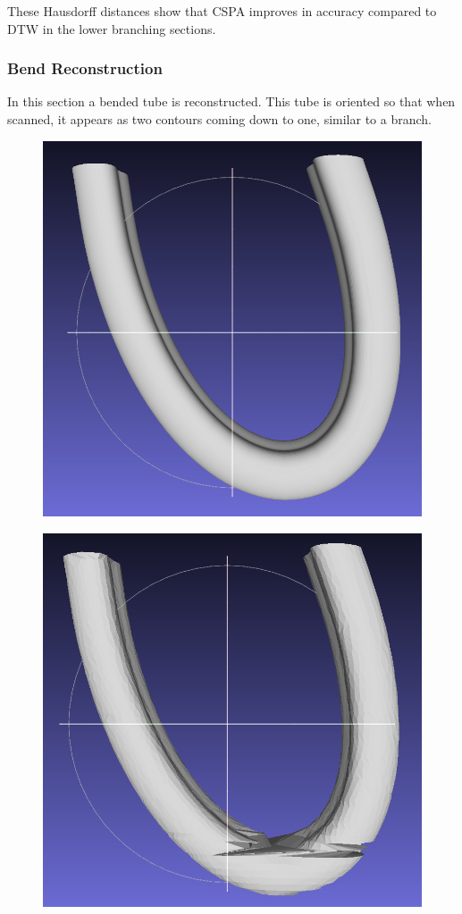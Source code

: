 \documentclass[11p, titlepage]{article}
\newcommand{\reconstructionleft}{0.3}
\newcommand{\reconstructionright}{0.67}
\begin{document}
These Hausdorff distances show that CSPA improves in accuracy compared to DTW in the lower branching sections.
\pagebreak

\subsubsection{Bend Reconstruction}

In this section a bended tube is reconstructed. This tube is oriented so that when scanned, it appears as two contours coming down to one, similar to a branch.

\begin{figure}[h!]
     \centering
     \begin{minipage}[b]{\reconstructionleft\linewidth}
       {\includegraphics[width=\linewidth]{originals/bend}}%
     \end{minipage}%
     \hfill
     \begin{minipage}[b]{\reconstructionright\linewidth}
       {\includegraphics[width=.48\linewidth]{reconstructions/dtw-bend-50}}%

\end{minipage}
\end{figure}
\end{document}
